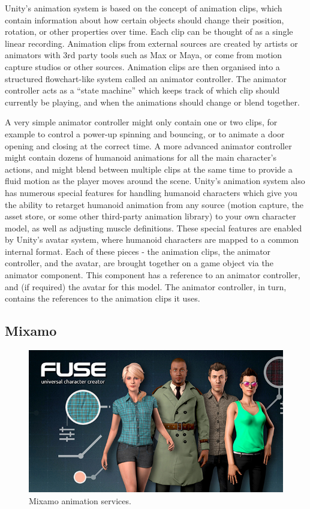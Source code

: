 \documentclass[a4paper, 12pt]{amsart}
\begin{document}
Unity's animation system is based on the concept of animation clips, which contain information about how certain objects should change their position, rotation, or other properties over time. Each clip can be thought of as a single linear recording. Animation clips from external sources are created by artists or animators with 3rd party tools such as Max or Maya, or come from motion capture studios or other sources. Animation clips are then organised into a structured flowchart-like system called an animator controller. The animator controller acts as a ``state machine'' which keeps track of which clip should currently be playing, and when the animations should change or blend together.

A very simple animator controller might only contain one or two clips, for example to control a power-up spinning and bouncing, or to animate a door opening and closing at the correct time. A more advanced animator controller might contain dozens of humanoid animations for all the main character's actions, and might blend between multiple clips at the same time to provide a fluid motion as the player moves around the scene. Unity's animation system also has numerous special features for handling humanoid characters which give you the ability to retarget humanoid animation from any source (motion capture, the asset store, or some other third-party animation library) to your own character model, as well as adjusting muscle definitions. These special features are enabled by Unity's avatar system, where humanoid characters are mapped to a common internal format. Each of these pieces - the animation clips, the animator controller, and the avatar, are brought together on a game object via the animator component. This component has a reference to an animator controller, and (if required) the avatar for this model. The animator controller, in turn, contains the references to the animation clips it uses.

\subsection{Mixamo}

\begin{figure}[htb]
\centering
\includegraphics[width=.9\linewidth]{fig_mixamo_logo}
\caption{Mixamo animation services.}
\label{fig:mixamo_logo}
\end{figure}
\end{document}
